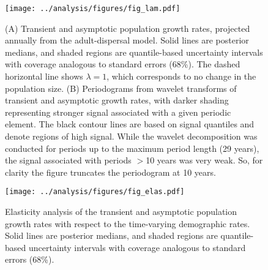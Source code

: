 \documentclass[11pt]{article}
\begin{document}
\newpage{}
\begin{figure}
\centering
\texttt{[image: ../analysis/figures/fig\_lam.pdf]}
\caption{\label{fig:lam}
(A) Transient and asymptotic population growth rates,
projected annually from the adult-dispersal model.
Solid lines are posterior medians,
and shaded regions are quantile-based uncertainty intervals
with coverage analogous to standard errors (68\%).
The dashed horizontal line shows $\lambda=1$, 
which corresponds to no change in the population size.
(B) Periodograms from wavelet transforms of transient and asymptotic growth rates,
with darker shading representing stronger signal associated with a given periodic element.
The black contour lines are based on signal quantiles and denote regions of high signal.
While the wavelet decomposition was conducted for periods up to the maximum period length
(29 years), the signal associated with periods $>$10 years was very weak. 
So, for clarity the figure truncates the periodogram at 10 years.
}
\end{figure}
\clearpage{}

\newpage{}
\begin{figure}
\centering
\texttt{[image: ../analysis/figures/fig\_elas.pdf]}
\caption{\label{fig:elas}
Elasticity analysis of the transient and asymptotic population growth rates 
with respect to the time-varying demographic rates.
Solid lines are posterior medians,
and shaded regions are quantile-based uncertainty intervals
with coverage analogous to standard errors (68\%).
}
\end{figure}
\clearpage{}
\end{document}
